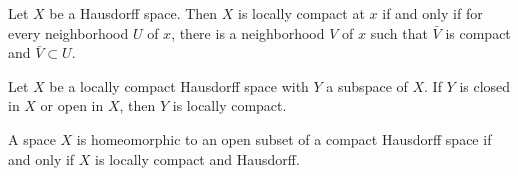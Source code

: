     \begin{lemma}
      Let $X$ be a Hausdorff space. Then $X$ is locally compact at $x$ if and only if for every neighborhood $U$ of $x$, there is a neighborhood $V$ of $x$ such that $\bar{V}$ is compact and $\bar{V} \subset U$. 
    \end{lemma}

    \begin{corollary}
      Let $X$ be a locally compact Hausdorff space with $Y$ a subspace of $X$. If $Y$ is closed in $X$ or open in $X$, then $Y$ is locally compact. 
    \end{corollary}

    \begin{corollary}
      A space $X$ is homeomorphic to an open subset of a compact Hausdorff space if and only if $X$ is locally compact and Hausdorff. 
    \end{corollary}
